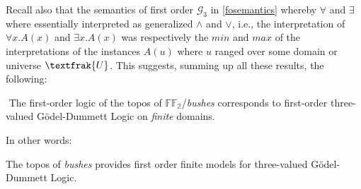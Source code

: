 Recall also that the semantics of first order $\mathcal{G}_3$ in \ref{fosemantics} whereby $\forall$ and $\exists$ where essentially interpreted as generalized $\land$ and $\lor$, i.e., the interpretation of $\forall x. A(x)$ and $\exists x.A(x)$ was respectively the $min$ and $max$ of the interpretations of the instances $A(u)$ where $u$ ranged over some domain or universe $\textfrak{U}$.
\newline\newline
This suggests, summing up all these results, the following:

\begin{thm}
${}$ \newline
The first-order logic of the topos of $\mathbb{FF_2}$/\emph{bushes} corresponds to first-order three-valued Gödel-Dummett Logic on \emph{finite} domains.  
\end{thm}		 

In other words:	 
\begin{remark}
	The topos of \emph{bushes} provides first order finite models for three-valued Gödel-Dummett Logic.
\end{remark}		 
		 
		 
	\newpage
${}$ \newpage		 